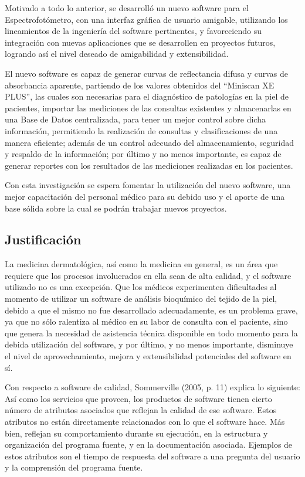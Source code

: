 \documentclass[12pt, a4paper]{article}
\begin{document}
Motivado a todo lo anterior, se desarroll\'{o} un nuevo software para el Espectrofot\'{o}metro, con una interfaz gr\'{a}fica de usuario amigable, utilizando los lineamientos de la ingenier\'{i}a del software pertinentes, y favoreciendo su integraci\'{o}n con nuevas aplicaciones que se desarrollen en proyectos futuros, logrando as\'{i} el nivel deseado de amigabilidad y extensibilidad.

El nuevo software es capaz de generar curvas de reflectancia difusa y curvas de absorbancia aparente, partiendo de los valores obtenidos del ``Miniscan XE PLUS'', las cuales son necesarias para el diagn\'{o}stico de patolog\'{i}as en la piel de pacientes, importar las mediciones de las consultas existentes y almacenarlas en una Base de Datos centralizada, para tener un mejor control sobre dicha informaci\'{o}n, permitiendo la realizaci\'{o}n de consultas y clasificaciones de una manera eficiente; adem\'{a}s de un control adecuado del almacenamiento, seguridad y respaldo de la informaci\'{o}n; por \'{u}ltimo y no menos importante, es capaz de generar reportes con los resultados de las mediciones realizadas en los pacientes.

Con esta investigaci\'{o}n se espera fomentar la utilizaci\'{o}n del nuevo software, una mejor capacitaci\'{o}n del personal m\'{e}dico para su debido uso y el aporte de una base s\'{o}lida sobre la cual se podr\'{a}n trabajar nuevos proyectos.

\subsection{Justificaci\'{o}n}
La medicina dermatol\'{o}gica, as\'{i} como la medicina en general, es un \'{a}rea que requiere que los procesos involucrados en ella sean de alta calidad, y el software utilizado no es una excepci\'{o}n. Que los m\'{e}dicos experimenten dificultades al momento de utilizar un software de an\'{a}lisis bioqu\'{i}mico del tejido de la piel, debido a que el mismo no fue desarrollado adecuadamente, es un problema grave, ya que no s\'{o}lo ralentiza al m\'{e}dico en su labor de consulta con el paciente, sino que genera la necesidad de asistencia t\'{e}cnica disponible en todo momento para la debida utilizaci\'{o}n del software, y por \'{u}ltimo, y no menos importante, disminuye el nivel de aprovechamiento, mejora y extensibilidad potenciales del software en s\'{i}.

Con respecto a software de calidad, Sommerville (2005, p. 11) explica lo siguiente: As\'{i} como los servicios que proveen, los productos de software tienen cierto n\'{u}mero de atributos asociados que reflejan la calidad de ese software. Estos atributos no est\'{a}n directamente relacionados con lo que el software hace. M\'{a}s bien, reflejan su comportamiento durante su ejecuci\'{o}n, en la estructura y organizaci\'{o}n del programa fuente, y en la documentaci\'{o}n asociada. Ejemplos de estos atributos son el tiempo de respuesta del software a una pregunta del usuario y la comprensi\'{o}n del programa fuente.
\end{document}
